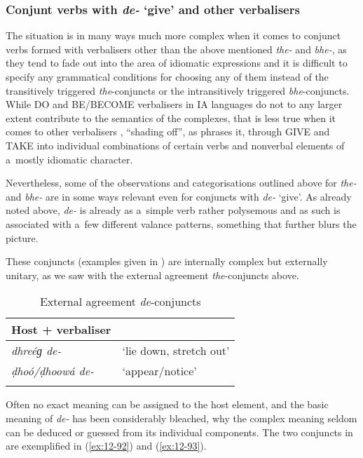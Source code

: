 \subsubsection*{Conjunt verbs with \textit{de-} `give' and other verbalisers}

The situation is in many ways much more complex when it comes to conjunct verbs formed with
verbalisers other than the above mentioned \textit{the-} and \textit{bhe-}, as they tend to fade out
into the area of idiomatic expressions and it is difficult to specify any grammatical conditions for
choosing any of them instead of the transitively triggered \textit{the}-conjuncts or the
intransitively triggered \textit{bhe}-conjuncts. While DO and BE/BECOME verbalisers in IA
languages do not to any larger extent contribute to the semantics of the complexes, that is less
true when it comes to other verbalisers \citep[78--79]{gambhir1993}, ``shading off'', as
\citet[157]{masica1993} phrases it, through GIVE and TAKE into individual combinations of certain
verbs and nonverbal elements of a~mostly idiomatic character.



Nevertheless, some of the observations and categorisations outlined above for \textit{the-} and \textit{bhe-} are in some ways relevant even for conjuncts with \textit{de-} `give'. As already noted above, \textit{de-} is already as a~simple verb rather polysemous and as such is associated with a~few different valance patterns, something that further blurs the picture.


 These conjuncts (examples given in ) are internally complex but externally unitary, as we saw with the external agreement \textit{the}-conjuncts above. 


\begin{table}[ht]
\caption{External agreement \textit{de}-conjuncts}
\begin{tabularx}{.75\textwidth}{ l@{\hspace{45pt}} Q }
\lsptoprule
Host + verbaliser &
\\\hline
\textit{dhreéɡ de-} &
`lie down, stretch out'\\
\textit{ḍhoó/ḍhoowá de-} &
`appear/notice'\\\lspbottomrule
\end{tabularx}
\label{tab:12-7}
\end{table}


Often no exact meaning can be assigned to the host element, and the basic meaning of \textit{de-} has been considerably bleached, why the complex meaning seldom can be deduced or guessed from its individual components. The two conjuncts in  are exemplified in (\ref{ex:12-92}) and (\ref{ex:12-93}).

